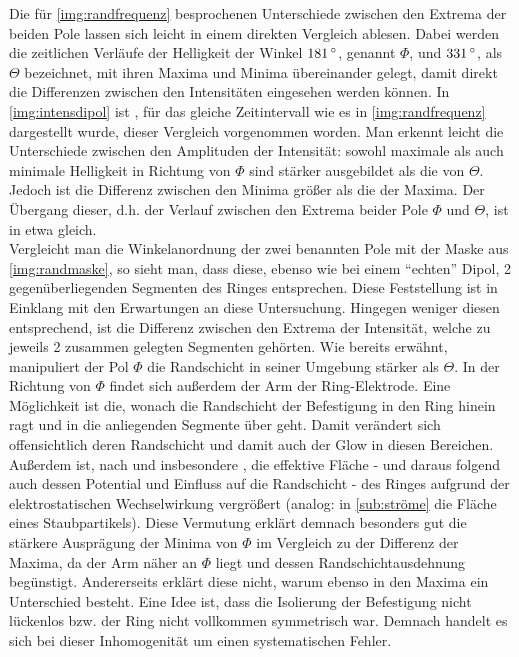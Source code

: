 \documentclass[numbers=noenddot,a4paper]{scrartcl}
\newcommand{\degree}{^\circ}
\begin{document}
					Die für \ref{img:randfrequenz} besprochenen Unterschiede zwischen den Extrema der beiden Pole lassen sich leicht in einem direkten Vergleich ablesen. Dabei werden die zeitlichen Verläufe der Helligkeit der Winkel $\unit[181]{\degree}$, genannt $\Phi$, und $\unit[331]{\degree}$, als $\Theta$ bezeichnet, mit ihren Maxima und Minima übereinander gelegt, damit direkt die Differenzen zwischen den Intensitäten eingesehen werden können. In \ref{img:intensdipol} ist , für das gleiche Zeitintervall wie es in \ref{img:randfrequenz} dargestellt wurde, dieser Vergleich vorgenommen worden. Man erkennt leicht die Unterschiede zwischen den Amplituden der Intensität: sowohl maximale als auch minimale Helligkeit in Richtung von $\Phi$ sind stärker ausgebildet als die von $\Theta$. Jedoch ist die Differenz zwischen den Minima größer als die der Maxima. Der Übergang dieser, d.h. der Verlauf zwischen den Extrema beider Pole $\Phi$ und $\Theta$, ist in etwa gleich.\\
					Vergleicht man die Winkelanordnung der zwei benannten Pole mit der Maske aus \ref{img:randmaske}, so sieht man, dass diese, ebenso wie bei einem "`echten"' Dipol, 2 gegenüberliegenden Segmenten des Ringes entsprechen. Diese Feststellung ist in Einklang mit den Erwartungen an diese Untersuchung. Hingegen weniger diesen entsprechend, ist die Differenz zwischen den Extrema der Intensität, welche zu jeweils 2 zusammen gelegten Segmenten gehörten. Wie bereits erwähnt, manipuliert der Pol $\Phi$ die Randschicht in seiner Umgebung stärker als $\Theta$. In der Richtung von $\Phi$ findet sich außerdem der Arm der Ring-Elektrode. Eine Möglichkeit ist die, wonach die Randschicht der Befestigung in den Ring hinein ragt und in die anliegenden Segmente über geht. Damit verändert sich offensichtlich deren Randschicht und damit auch der Glow in diesen Bereichen. Außerdem ist, nach \cite{Bonitz10} und insbesondere \cite{Child11}, die effektive Fläche - und daraus folgend auch dessen Potential und Einfluss auf die Randschicht - des Ringes aufgrund der elektrostatischen Wechselwirkung vergrößert (analog: in \ref{sub:ströme} die Fläche eines Staubpartikels). Diese Vermutung erklärt demnach besonders gut die stärkere Ausprägung der Minima von $\Phi$ im Vergleich zu der Differenz der Maxima, da der Arm näher an $\Phi$ liegt und dessen Randschichtausdehnung begünstigt. Andererseits erklärt diese nicht, warum ebenso in den Maxima ein Unterschied besteht.  Eine Idee ist, dass die Isolierung der Befestigung nicht lückenlos bzw. der Ring nicht vollkommen symmetrisch war. Demnach handelt es sich bei dieser Inhomogenität um einen systematischen Fehler.
\end{document}
